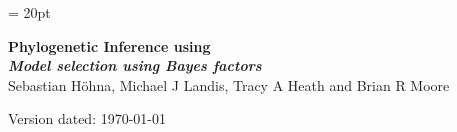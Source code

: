 \documentclass[11pt]{article}
\begin{document}
\renewcommand{\headrulewidth}{0.5pt}
\headsep = 20pt
\lhead{ }

\thispagestyle{plain}
\begin{center}

\textbf{\LARGE Phylogenetic Inference using \RevBayes}\\\vspace{2mm}
\textbf{\it{\Large Model selection using Bayes factors}}\\\vspace{2mm}
\vspace{1cm}
{\Large Sebastian H{\"o}hna, Michael J Landis, Tracy A Heath and Brian R Moore}
\vspace{1cm}
\end{center}

\def \ResourcePath {./}
\def \GlobalResourcePath {../}


Version dated: \today
\end{document}
